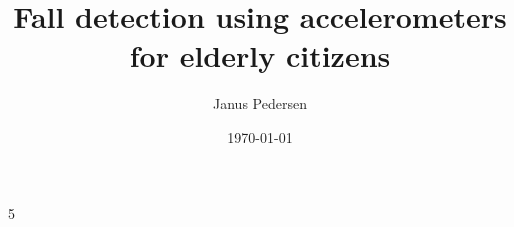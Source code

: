 
\newcommand{\authors}{
    Emma Strandholdt Madsen, 
    Maria Lilly Nielsen, 
    Janus Langkilde Pedersen \& 
    Peter Kaae Thorhauge
}
\newcommand{\reporttitle}{Fall detection using accelerometers for elderly citizens}
\newcommand{\subject}{Embedded Systems Programming}



\author{Janus Pedersen}
\date{\today}
\title{\reporttitle}
\pagestyle{empty} %
% 



\cleardoublepage
{}
\renewcommand{\thesection}{\arabic{section}} 
\tableofcontents
\newpage
\pagestyle{fancy} %
\fancyhf{} %
\fancyhead[R]{\thepage} %
\listoffigures

\newpage
{}













\cleardoublepage
\label{main:end} %

\printbibliography
\cleardoublepage

\appendix
\renewcommand{\thesubsection}{\Alph{subsection}}


5
